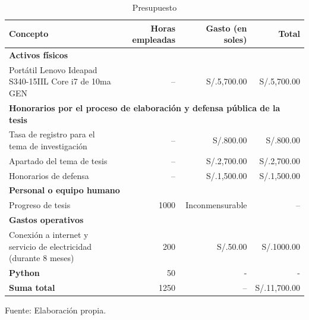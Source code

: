 \begin{table}[h!]
	\caption{Presupuesto}
	\label{tab:presupuesto}
	\centering
	\small
	\begin{tabular}{p{6cm}rrr}
		\toprule
		\textbf{Concepto} & \textbf{Horas empleadas} & \textbf{Gasto (en soles)} & \textbf{Total} \\
		\midrule
		\multicolumn{4}{l}{\textbf{Activos físicos}} \\
		Portátil Lenovo Ideapad S340-15IIL Core i7 de 10ma GEN & -- & S/.5,700.00 & S/.5,700.00 \\
		\midrule
		\multicolumn{4}{l}{\textbf{Honorarios por el proceso de elaboración y defensa pública de la tesis}} \\
		Tasa de registro para el tema de investigación & -- & S/.800.00 & S/.800.00 \\
		Apartado del tema de tesis & -- & S/.2,700.00 & S/.2,700.00 \\
		Honorarios de defensa & -- & S/.1,500.00 & S/.1,500.00 \\
		\midrule
		\multicolumn{4}{l}{\textbf{Personal o equipo humano}} \\
		Progreso de tesis & 1000 & Inconmensurable & -- \\
		\midrule
		\multicolumn{4}{l}{\textbf{Gastos operativos}} \\
		Conexión a internet y servicio de electricidad (durante 8 meses) & 200 & S/.50.00 & S/.1000.00 \\
		\midrule
		\textbf{Python} & 50 & - & - \\
		\midrule
		\textbf{Suma total} & 1250 & -- & S/.11,700.00 \\
		\bottomrule
	\end{tabular}
	\begin{flushleft}
		\small Fuente: Elaboración propia.
	\end{flushleft}
\end{table}


